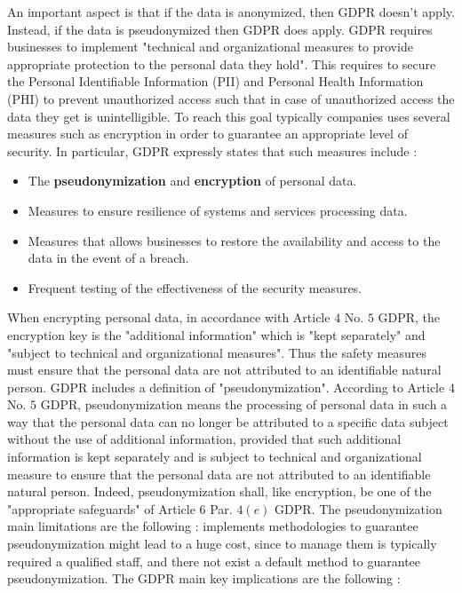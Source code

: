 An important aspect is that if the data is anonymized, then GDPR doesn't apply. Instead, if the data is pseudonymized then GDPR does apply. GDPR requires businesses to implement "technical and organizational measures to provide appropriate protection to the personal data they hold". This requires to secure the Personal Identifiable Information (PII) and Personal Health Information (PHI) to prevent unauthorized access such that in case of unauthorized access the data they get is unintelligible. To reach this goal typically companies uses several measures such as encryption in order to guarantee an appropriate level of security. In particular, GDPR expressly states that such measures include :
\begin{itemize}
\item The \textbf{pseudonymization} and \textbf{encryption} of personal data.
\item Measures to ensure resilience of systems and services processing data.
\item Measures that allows businesses to restore the availability and access to the data in the event of a breach.
\item Frequent testing of the effectiveness of the security measures.
\end{itemize}
When encrypting personal data, in accordance with Article $4$ No. $5$ GDPR, the encryption key is the "additional information" which is "kept separately" and "subject to technical and organizational measures". Thus the safety measures must ensure that the personal data are not attributed to an identifiable natural person. GDPR includes a definition of "pseudonymization". According to Article $4$ No. $5$ GDPR, pseudonymization means the processing of personal data in such a way that the personal data can no longer be attributed to a specific data subject without the use of additional information, provided that such additional information is kept separately and is subject to technical and organizational measure to ensure that the personal data are not attributed to an identifiable natural person. Indeed, pseudonymization shall, like encryption, be one of the "appropriate safeguards" of Article $6$ Par. $4 (e)$ GDPR. The pseudonymization main limitations are the following : implements methodologies to guarantee pseudonymization might lead to a huge cost, since to manage them is typically required a qualified staff, and there not exist a default method to guarantee pseudonymization. The GDPR main key implications are the following :
